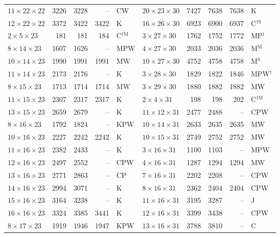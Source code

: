 \begin{longtable}{@{}lrrrl@{\hspace{6mm}}lrrrl@{}}
$11{\times}22{\times}22$ & 3226 & 3228 & -- & CW & $20{\times}23{\times}30$ & 7427 & 7638 & 7638 & K\\
$12{\times}22{\times}22$ & 3372 & 3422 & 3422 & K & $16{\times}26{\times}30$ & 6923 & 6900 & 6937 & C$^{\dagger\mathrm{S}}$\\
$2{\times}5{\times}23$ & 181 & 181 & 184 & C$^{\dagger\mathrm{M}}$ & $3{\times}27{\times}30$ & 1762 & 1752 & 1772 & MP$^{\dagger}$\\
$8{\times}14{\times}23$ & 1607 & 1626 & -- & MPW & $4{\times}27{\times}30$ & 2033 & 2036 & 2036 & M$^{\mathrm{M}}$\\
$10{\times}14{\times}23$ & 1990 & 1991 & 1991 & MW & $10{\times}27{\times}30$ & 4752 & 4758 & 4758 & M$^{\mathrm{S}}$\\
$11{\times}14{\times}23$ & 2173 & 2176 & -- & K & $3{\times}28{\times}30$ & 1829 & 1822 & 1846 & MPW$^{\dagger}$\\
$8{\times}15{\times}23$ & 1713 & 1714 & 1714 & MW & $3{\times}29{\times}30$ & 1880 & 1882 & 1882 & MW\\
$11{\times}15{\times}23$ & 2307 & 2317 & 2317 & K & $2{\times}4{\times}31$ & 198 & 198 & 202 & C$^{\dagger\mathrm{M}}$\\
$13{\times}15{\times}23$ & 2659 & 2679 & -- & K & $11{\times}12{\times}31$ & 2477 & 2488 & -- & CPW\\
$8{\times}16{\times}23$ & 1792 & 1824 & -- & KPW & $10{\times}14{\times}31$ & 2633 & 2635 & 2635 & MW\\
$10{\times}16{\times}23$ & 2227 & 2242 & 2242 & K & $10{\times}15{\times}31$ & 2749 & 2752 & 2752 & MW\\
$11{\times}16{\times}23$ & 2382 & 2433 & -- & K & $3{\times}16{\times}31$ & 1100 & 1103 & -- & MPW\\
$12{\times}16{\times}23$ & 2497 & 2552 & -- & CPW & $4{\times}16{\times}31$ & 1287 & 1294 & 1294 & MW\\
$13{\times}16{\times}23$ & 2771 & 2863 & -- & CP & $7{\times}16{\times}31$ & 2202 & 2208 & -- & CPW\\
$14{\times}16{\times}23$ & 2994 & 3071 & -- & K & $8{\times}16{\times}31$ & 2362 & 2404 & 2404 & CPW\\
$15{\times}16{\times}23$ & 3164 & 3238 & -- & K & $11{\times}16{\times}31$ & 3195 & 3287 & -- & J\\
$16{\times}16{\times}23$ & 3324 & 3385 & 3441 & K & $12{\times}16{\times}31$ & 3399 & 3438 & -- & CPW\\
$8{\times}17{\times}23$ & 1919 & 1946 & 1947 & KPW & $13{\times}16{\times}31$ & 3788 & 3810 & -- & C\\

\end{longtable}

